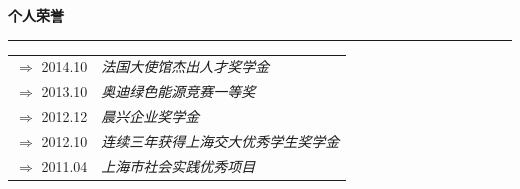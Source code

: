 \documentclass[a4paper,12pt,final]{memoir}
\newcommand{\SmallSep}{\vspace{0.9em}}
\newcommand{\CVSection}[1]
	{\Large\textbf{#1}\par
	\vspace{0.2cm}\normalsize\normalfont}
\begin{document}
\begin{CJK*}{UTF8}{gbsn}
\CVSection{个人荣誉}
\hrule
\SmallSep
	\begin{tabular}{l|l}
		$\Rightarrow$ 2014.10&\textit{法国大使馆杰出人才奖学金}\footnotesize\\
		$\Rightarrow$ 2013.10&\textit{奥迪绿色能源竞赛一等奖}\\
		$\Rightarrow$ 2012.12&\textit{晨兴企业奖学金}\\
		$\Rightarrow$ 2012.10&\textit{连续三年获得上海交大优秀学生奖学金}\\
		$\Rightarrow$ 2011.04&\textit{上海市社会实践优秀项目}\footnotesize\\
	\end{tabular}

\end{CJK*}
\end{document}
